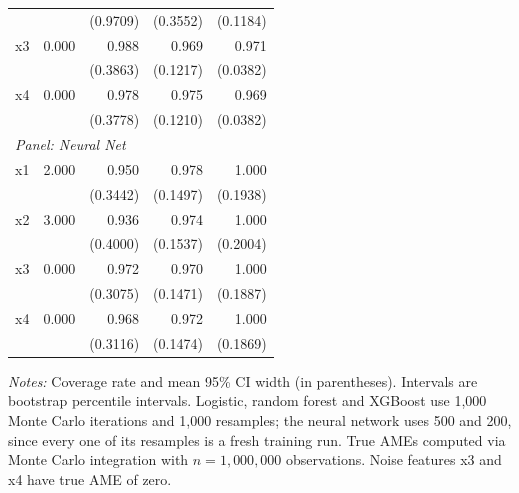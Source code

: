 \begin{table}[htbp]
\begin{threeparttable}
\begin{tabular}{lrrrr}
 &  & (0.9709) & (0.3552) & (0.1184) \\
\quad x3 & 0.000 & 0.988 & 0.969 & 0.971 \\
 &  & (0.3863) & (0.1217) & (0.0382) \\
\quad x4 & 0.000 & 0.978 & 0.975 & 0.969 \\
 &  & (0.3778) & (0.1210) & (0.0382) \\
\midrule
\multicolumn{5}{l}{\textit{Panel: Neural Net}} \\
\quad x1 & 2.000 & 0.950 & 0.978 & 1.000 \\
 &  & (0.3442) & (0.1497) & (0.1938) \\
\quad x2 & 3.000 & 0.936 & 0.974 & 1.000 \\
 &  & (0.4000) & (0.1537) & (0.2004) \\
\quad x3 & 0.000 & 0.972 & 0.970 & 1.000 \\
 &  & (0.3075) & (0.1471) & (0.1887) \\
\quad x4 & 0.000 & 0.968 & 0.972 & 1.000 \\
 &  & (0.3116) & (0.1474) & (0.1869) \\
\bottomrule
\end{tabular}
\begin{tablenotes}
\footnotesize
\item \textit{Notes:} Coverage rate and mean 95\% CI width (in parentheses). Intervals are bootstrap percentile intervals. Logistic, random forest and XGBoost use 1{,}000 Monte Carlo iterations and 1{,}000 resamples; the neural network uses 500 and 200, since every one of its resamples is a fresh training run. True AMEs computed via Monte Carlo integration with $n=1{,}000{,}000$ observations. Noise features x3 and x4 have true AME of zero.
\end{tablenotes}
\end{threeparttable}
\end{table}
